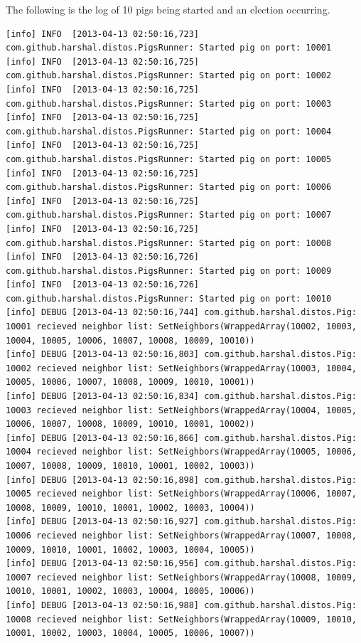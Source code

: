 \documentclass[]{article}
\begin{document}
The following is the log of 10 pigs being started and an election occurring.
\tiny\begin{verbatim}
[info] INFO  [2013-04-13 02:50:16,723] com.github.harshal.distos.PigsRunner: Started pig on port: 10001
[info] INFO  [2013-04-13 02:50:16,725] com.github.harshal.distos.PigsRunner: Started pig on port: 10002
[info] INFO  [2013-04-13 02:50:16,725] com.github.harshal.distos.PigsRunner: Started pig on port: 10003
[info] INFO  [2013-04-13 02:50:16,725] com.github.harshal.distos.PigsRunner: Started pig on port: 10004
[info] INFO  [2013-04-13 02:50:16,725] com.github.harshal.distos.PigsRunner: Started pig on port: 10005
[info] INFO  [2013-04-13 02:50:16,725] com.github.harshal.distos.PigsRunner: Started pig on port: 10006
[info] INFO  [2013-04-13 02:50:16,725] com.github.harshal.distos.PigsRunner: Started pig on port: 10007
[info] INFO  [2013-04-13 02:50:16,725] com.github.harshal.distos.PigsRunner: Started pig on port: 10008
[info] INFO  [2013-04-13 02:50:16,726] com.github.harshal.distos.PigsRunner: Started pig on port: 10009
[info] INFO  [2013-04-13 02:50:16,726] com.github.harshal.distos.PigsRunner: Started pig on port: 10010
[info] DEBUG [2013-04-13 02:50:16,744] com.github.harshal.distos.Pig: 10001 recieved neighbor list: SetNeighbors(WrappedArray(10002, 10003, 10004, 10005, 10006, 10007, 10008, 10009, 10010))
[info] DEBUG [2013-04-13 02:50:16,803] com.github.harshal.distos.Pig: 10002 recieved neighbor list: SetNeighbors(WrappedArray(10003, 10004, 10005, 10006, 10007, 10008, 10009, 10010, 10001))
[info] DEBUG [2013-04-13 02:50:16,834] com.github.harshal.distos.Pig: 10003 recieved neighbor list: SetNeighbors(WrappedArray(10004, 10005, 10006, 10007, 10008, 10009, 10010, 10001, 10002))
[info] DEBUG [2013-04-13 02:50:16,866] com.github.harshal.distos.Pig: 10004 recieved neighbor list: SetNeighbors(WrappedArray(10005, 10006, 10007, 10008, 10009, 10010, 10001, 10002, 10003))
[info] DEBUG [2013-04-13 02:50:16,898] com.github.harshal.distos.Pig: 10005 recieved neighbor list: SetNeighbors(WrappedArray(10006, 10007, 10008, 10009, 10010, 10001, 10002, 10003, 10004))
[info] DEBUG [2013-04-13 02:50:16,927] com.github.harshal.distos.Pig: 10006 recieved neighbor list: SetNeighbors(WrappedArray(10007, 10008, 10009, 10010, 10001, 10002, 10003, 10004, 10005))
[info] DEBUG [2013-04-13 02:50:16,956] com.github.harshal.distos.Pig: 10007 recieved neighbor list: SetNeighbors(WrappedArray(10008, 10009, 10010, 10001, 10002, 10003, 10004, 10005, 10006))
[info] DEBUG [2013-04-13 02:50:16,988] com.github.harshal.distos.Pig: 10008 recieved neighbor list: SetNeighbors(WrappedArray(10009, 10010, 10001, 10002, 10003, 10004, 10005, 10006, 10007))

\end{verbatim}
\end{document}

